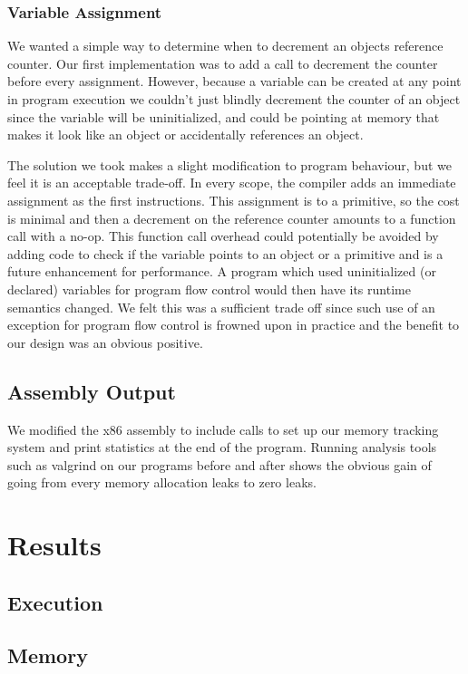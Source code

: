 \documentclass{sigplanconf}
\begin{document}
\subsubsection{Variable Assignment}
We wanted a simple way to determine when to decrement an objects reference counter.  Our first implementation was to add a call to decrement the counter before every assignment.  However, because a variable can be created at any point in program execution we couldn't just blindly decrement the counter of an object since the variable will be uninitialized, and could be pointing at memory that makes it look like an object or accidentally references an object.
\par
The solution we took makes a slight modification to program behaviour, but we feel it is an acceptable trade-off.  In every scope, the compiler adds an immediate assignment as the first instructions.  This assignment is to a primitive, so the cost is minimal and then a decrement on the reference counter amounts to a function call with a no-op.  This function call overhead could potentially be avoided by adding code to check if the variable points to an object or a primitive and is a future enhancement for performance.  A program which used uninitialized (or declared) variables for program flow control would then have its runtime semantics changed.  We felt this was a sufficient trade off since such use of an exception for program flow control is frowned upon in practice and the benefit to our design was an obvious positive.


\subsection{Assembly Output}
We modified the x86 assembly to include calls to set up our memory tracking system and print statistics at the end of the program.  Running analysis tools such as valgrind on our programs before and after shows the obvious gain of going from every memory allocation leaks to zero leaks.

\section{Results}
\label{sec:results}

\subsection{Execution}

\subsection{Memory}
\end{document}
